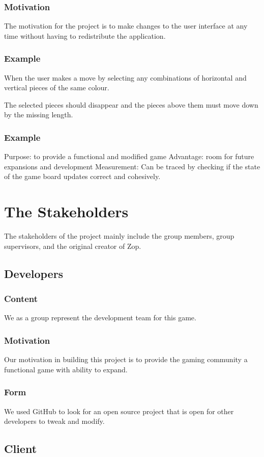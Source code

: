 \documentclass[12pt]{article}
\begin{document}
\subsubsection{Motivation}
 The motivation for the project is to make changes to the user interface at any time without having to redistribute the application.
\subsubsection{Example}
When the user makes a move by selecting any combinations of horizontal and vertical pieces of the same colour.

The selected pieces should disappear and the pieces above them must move down by the missing length.
\subsubsection{Example}
Purpose: to provide a functional and modified game
Advantage: room for future expansions and development
Measurement: Can be traced by checking if the state of the game board updates correct and cohesively.

\section{The Stakeholders}
The stakeholders of the project mainly include the group members, group supervisors, and the original creator of Zop.

\subsection{Developers}
\subsubsection{Content}
We as a group represent the development team for this game.
\subsubsection{Motivation}
Our motivation in building this project is to provide the gaming community a functional game with ability to expand.
\subsubsection{Form}
 We used GitHub to look for an open source project that is open for other developers to tweak and modify.
\subsection{Client}
\end{document}
